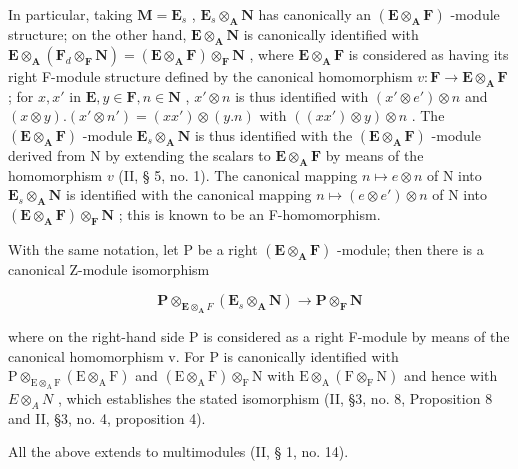 In particular, taking \(\mathbf{M} = \mathbf{E}_s\) , \(\mathbf{E}_s \otimes_{\mathbf{A}} \mathbf{N}\) has canonically an \((\mathbf{E} \otimes_{\mathbf{A}} \mathbf{F})\) -module structure; on the other hand, \(\mathbf{E} \otimes_{\mathbf{A}} \mathbf{N}\) is canonically identified with \(\mathbf{E} \otimes_{\mathbf{A}} (\mathbf{F}_d \otimes_{\mathbf{F}} \mathbf{N}) = (\mathbf{E} \otimes_{\mathbf{A}} \mathbf{F}) \otimes_{\mathbf{F}} \mathbf{N}\) , where \(\mathbf{E} \otimes_{\mathbf{A}} \mathbf{F}\) is considered as having its right F-module structure defined by the canonical homomorphism \(v: \mathbf{F} \to \mathbf{E} \otimes_{\mathbf{A}} \mathbf{F}\) ; for \(x, x'\) in \(\mathbf{E}, y \in \mathbf{F}, n \in \mathbf{N}\) , \(x' \otimes n\) is thus identified with \((x' \otimes e') \otimes n\) and \((x \otimes y).(x' \otimes n') = (xx') \otimes (y.n)\) with \(((xx') \otimes y) \otimes n\) . The \((\mathbf{E} \otimes_{\mathbf{A}} \mathbf{F})\) -module \(\mathbf{E}_s \otimes_{\mathbf{A}} \mathbf{N}\) is thus identified with the \((\mathbf{E} \otimes_{\mathbf{A}} \mathbf{F})\) -module derived from N by extending the scalars to \(\mathbf{E} \otimes_{\mathbf{A}} \mathbf{F}\) by means of the homomorphism \(v\) (II, § 5, no. 1). The canonical mapping \(n \mapsto e \otimes n\) of N into \(\mathbf{E}_s \otimes_{\mathbf{A}} \mathbf{N}\) is identified with the canonical mapping \(n \mapsto (e \otimes e') \otimes n\) of N into \((\mathbf{E} \otimes_{\mathbf{A}} \mathbf{F}) \otimes_{\mathbf{F}} \mathbf{N}\) ; this is known to be an F-homomorphism.

With the same notation, let P be a right \((\mathbf{E} \otimes_{\mathbf{A}} \mathbf{F})\) -module; then there is a canonical Z-module isomorphism

\[
\mathbf {P} \otimes_ {\mathbf {E} \otimes_ {\mathbf {A}} F} (\mathbf {E} _ {s} \otimes_ {\mathbf {A}} \mathbf {N}) \rightarrow \mathbf {P} \otimes_ {\mathbf {F}} \mathbf {N}\tag{11}
\]

where on the right-hand side P is considered as a right F-module by means of the canonical homomorphism v. For P is canonically identified with \(\mathrm{P}\otimes_{\mathrm{E}\otimes_{\mathrm{A}}\mathrm{F}}(\mathrm{E}\otimes_{\mathrm{A}}\mathrm{F})\) and \((\mathrm{E}\otimes_{\mathrm{A}}\mathrm{F})\otimes_{\mathrm{F}}\mathrm{N}\) with \(\mathrm{E}\otimes_{\mathrm{A}}(\mathrm{F}\otimes_{\mathrm{F}}\mathrm{N})\) and hence with \(E\otimes_{A}N\) , which establishes the stated isomorphism (II, §3, no. 8, Proposition 8 and II, §3, no. 4, proposition 4).

All the above extends to multimodules (II, § 1, no. 14).

